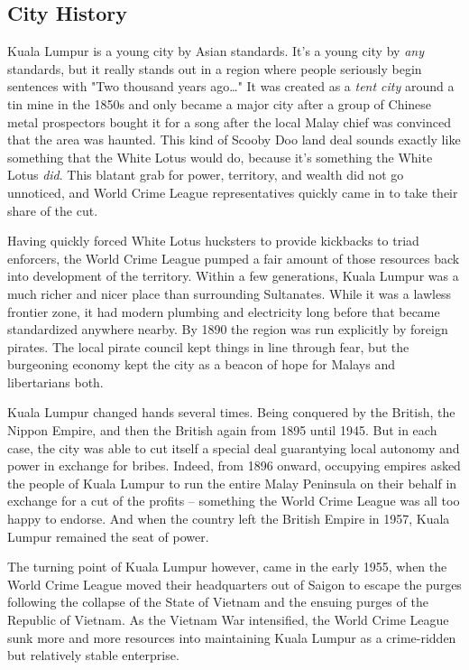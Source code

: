 \subsection{City History}

\hspace{\parindent} Kuala Lumpur is a young city by Asian standards. It's a young city by \textit{any} standards, but it really stands out in a region where people seriously begin sentences with "Two thousand years ago\ldots{}" It was created as a \textit{tent city} around a tin mine in the 1850s and only became a major city after a group of Chinese metal prospectors bought it for a song after the local Malay chief was convinced that the area was haunted. This kind of Scooby Doo land deal sounds exactly like something that the White Lotus would do, because it's something the White Lotus \textit{did}. This blatant grab for power, territory, and wealth did not go unnoticed, and World Crime League representatives quickly came in to take their share of the cut. 

Having quickly forced White Lotus hucksters to provide kickbacks to triad enforcers, the World Crime League pumped a fair amount of those resources back into development of the territory. Within a few generations, Kuala Lumpur was a much richer and nicer place than surrounding Sultanates. While it was a lawless frontier zone, it had modern plumbing and electricity long before that became standardized anywhere nearby. By 1890 the region was run explicitly by foreign pirates. The local pirate council kept things in line through fear, but the burgeoning economy kept the city as a beacon of hope for Malays and libertarians both.

Kuala Lumpur changed hands several times. Being conquered by the British, the Nippon Empire, and then the British again from 1895 until 1945. But in each case, the city was able to cut itself a special deal guarantying local autonomy and power in exchange for bribes. Indeed, from 1896 onward, occupying empires asked the people of Kuala Lumpur to run the entire Malay Peninsula on their behalf in exchange for a cut of the profits -- something the World Crime League was all too happy to endorse. And when the country left the British Empire in 1957, Kuala Lumpur remained the seat of power.

The turning point of Kuala Lumpur however, came in the early 1955, when the World Crime League moved their headquarters out of Saigon to escape the purges following the collapse of the State of Vietnam and the ensuing purges of the Republic of Vietnam. As the Vietnam War intensified, the World Crime League sunk more and more resources into maintaining Kuala Lumpur as a crime-ridden but relatively stable enterprise.

